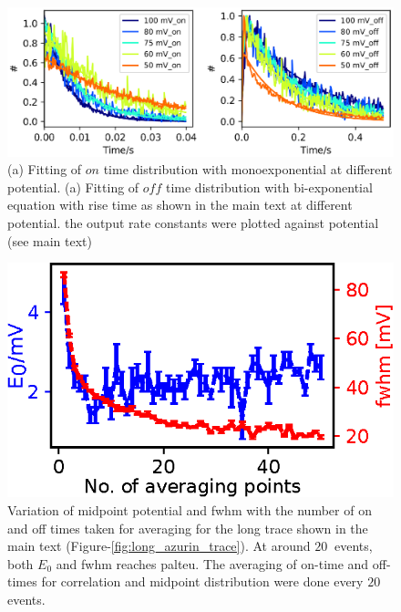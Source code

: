 \documentclass[11pt,a4paper,onecolumn]{article}
\begin{document}
\begin{figure}
  \centering
  \includegraphics{rate_fit_all_potential.eps}
  \makeatletter
  \renewcommand{\fnum@figure}{\figurename~S\thefigure}
  \makeatother
  \caption{(a) Fitting of $on$ time distribution with monoexponential at different potential. (a) Fitting of $off$ time distribution with bi-exponential equation with rise time as shown in the main text at different potential. the output rate constants were plotted against potential (see main text)}
  \label{SIfig: rate_fit_all_potential}
\end{figure}
\begin{figure}
  \centering
  \includegraphics[scale=1.5]{N_avgpoints_vs_fwhmwidth.eps}
  \makeatletter
  \renewcommand{\fnum@figure}{\figurename~S\thefigure}
  \makeatother
  \caption{Variation of midpoint potential and fwhm with the number of on and off times taken for averaging for the long trace shown in the main text (Figure-\ref{fig:long_azurin_trace}). At around $20~$ events, both $E_0$ and fwhm reaches palteu. The averaging of on-time and off-times for correlation and midpoint distribution were done every $20$ events.}
  \label{SIfig: N_avgpoints_vs_fwhmwidth}
\end{figure}

\end{document}
